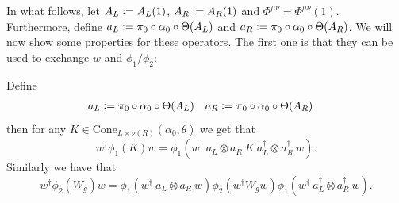 \documentclass[12pt,a4paper,twoside]{article}
\numberwithin{equation}{section}
\begin{document}
In what follows, let $A_L\vcentcolon= A_L(1)$, $A_R\vcentcolon= A_R(1)$ and $\Phi^{\mu\nu}=\Phi^{\mu\nu}(1)$. Furthermore, define $a_L\vcentcolon= \pi_0\circ\alpha_0\circ\Theta(A_L)$ and $a_R\vcentcolon= \pi_0\circ\alpha_0\circ\Theta(A_R)$. We will now show some properties for these operators. The first one is that they can be used to exchange $w$ and $\phi_1/\phi_2$:
\begin{lemma}
	Define
	\begin{align}
		a_L&\vcentcolon= \pi_0\circ\alpha_0\circ\Theta(A_L)&a_R&\vcentcolon= \pi_0\circ\alpha_0\circ\Theta(A_R)
	\end{align}
	then for any $K\in\text{Cone}_{L\times\nu(R)}(\alpha_0,\theta)$ we get that
	\begin{equation}\label{eq:TranslationOutOfPhi_K}
		w^\dagger \phi_1(K)w=\phi_1(w^\dagger \: a_L\otimes a_R \: K \: a_L^\dagger\otimes a_R^\dagger \: w).
	\end{equation}
	Similarly we have that
	\begin{equation}\label{eq:TranslationOutOfPhi_W}
		w^\dagger \phi_2(W_g)w=\phi_1(w^\dagger \: a_L\otimes a_R \: w)\phi_2(w^\dagger W_g w)\phi_1(w^\dagger \: a_L^\dagger\otimes a_R^\dagger \: w).
	\end{equation}
\end{lemma}
\end{document}
